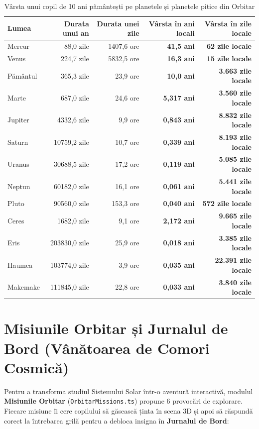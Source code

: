 \begin{table}[H]
\centering
\small
\caption{Vârsta unui copil de 10 ani pământești pe planetele și planetele pitice din Orbitar}
\begin{tabular}{@{}lrrrr@{}}
\toprule
\textbf{Lumea} & \textbf{Durata unui an} & \textbf{Durata unei zile} & \textbf{Vârsta în ani locali} & \textbf{Vârsta în zile locale} \\
\midrule
Mercur & 88,0 zile & 1407,6 ore & \textbf{41,5 ani} & \textbf{62 zile locale} \\
Venus & 224,7 zile & 5832,5 ore & \textbf{16,3 ani} & \textbf{15 zile locale} \\
Pământul & 365,3 zile & 23,9 ore & \textbf{10,0 ani} & \textbf{3.663 zile locale} \\
Marte & 687,0 zile & 24,6 ore & \textbf{5,317 ani} & \textbf{3.560 zile locale} \\
Jupiter & 4332,6 zile & 9,9 ore & \textbf{0,843 ani} & \textbf{8.832 zile locale} \\
Saturn & 10759,2 zile & 10,7 ore & \textbf{0,339 ani} & \textbf{8.193 zile locale} \\
Uranus & 30688,5 zile & 17,2 ore & \textbf{0,119 ani} & \textbf{5.085 zile locale} \\
Neptun & 60182,0 zile & 16,1 ore & \textbf{0,061 ani} & \textbf{5.441 zile locale} \\
Pluto & 90560,0 zile & 153,3 ore & \textbf{0,040 ani} & \textbf{572 zile locale} \\
Ceres & 1682,0 zile & 9,1 ore & \textbf{2,172 ani} & \textbf{9.665 zile locale} \\
Eris & 203830,0 zile & 25,9 ore & \textbf{0,018 ani} & \textbf{3.385 zile locale} \\
Haumea & 103774,0 zile & 3,9 ore & \textbf{0,035 ani} & \textbf{22.391 zile locale} \\
Makemake & 111845,0 zile & 22,8 ore & \textbf{0,033 ani} & \textbf{3.840 zile locale} \\
\bottomrule
\end{tabular}
\end{table}

\section{Misiunile Orbitar și Jurnalul de Bord (Vânătoarea de Comori Cosmică)}

Pentru a transforma studiul Sistemului Solar într-o aventură interactivă, modulul \textbf{Misiunile Orbitar} (\texttt{OrbitarMissions.ts}) propune 6 provocări de explorare. Fiecare misiune îi cere copilului să găsească ținta în scena 3D și apoi să răspundă corect la întrebarea grilă pentru a debloca insigna în \textbf{Jurnalul de Bord}:

